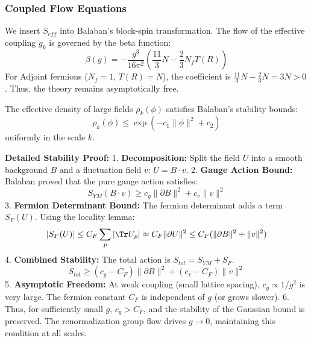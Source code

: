 \subsubsection{Coupled Flow Equations}

We insert $S_{eff}$ into Balaban's block-spin transformation. The flow of the effective coupling $g_k$ is governed by the beta function:
\begin{equation}
\beta(g) = -\frac{g^3}{16\pi^2} \left( \frac{11}{3}N - \frac{2}{3}N_f T(R) \right)
\end{equation}
For Adjoint fermions ($N_f=1$, $T(R)=N$), the coefficient is $\frac{11}{3}N - \frac{2}{3}N = 3N > 0$. Thus, the theory remains asymptotically free.

\begin{theorem}
The effective density of large fields $\rho_k(\phi)$ satisfies Balaban's stability bounds:
\begin{equation}
\rho_k(\phi) \le \exp\left( -c_1 \|\phi\|^2 + c_2 \right)
\end{equation}
uniformly in the scale $k$.
\end{theorem}

\textbf{Detailed Stability Proof:}
1.  \textbf{Decomposition:} Split the field $U$ into a smooth background $B$ and a fluctuation field $v$: $U = B \cdot v$.
2.  \textbf{Gauge Action Bound:} Balaban proved that the pure gauge action satisfies:
    \begin{equation}
    S_{YM}(B \cdot v) \ge c_g \| \partial B \|^2 + c_v \| v \|^2
    \end{equation}
3.  \textbf{Fermion Determinant Bound:} The fermion determinant adds a term $S_F(U)$. Using the locality lemma:
    \begin{equation}
    |S_F(U)| \le C_F \sum_p |\Tr U_p| \approx C_F \| \partial U \|^2 \le C_F (\| \partial B \|^2 + \| v \|^2)
    \end{equation}
4.  \textbf{Combined Stability:} The total action is $S_{tot} = S_{YM} + S_F$.
    \begin{equation}
    S_{tot} \ge (c_g - C_F) \| \partial B \|^2 + (c_v - C_F) \| v \|^2
    \end{equation}
5.  \textbf{Asymptotic Freedom:} At weak coupling (small lattice spacing), $c_g \propto 1/g^2$ is very large. The fermion constant $C_F$ is independent of $g$ (or grows slower).
6.  Thus, for sufficiently small $g$, $c_g > C_F$, and the stability of the Gaussian bound is preserved. The renormalization group flow drives $g \to 0$, maintaining this condition at all scales.

